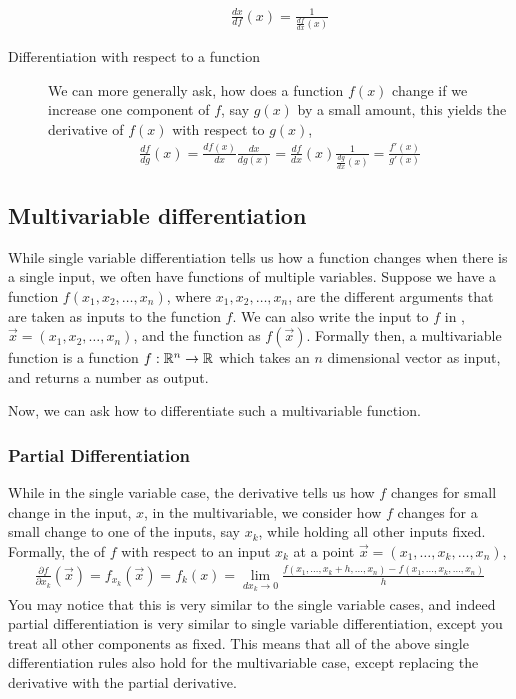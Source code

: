 \begin{description}
    \begin{align*}
        \frac{dx}{df}(x) = \frac{1}{\frac{df}{dx}(x)}
    \end{align*}  
    \item[Differentiation with respect to a function] We can more generally ask, how does a function $f(x)$ change if we increase one component of $f$, say $g(x)$ by a small amount, this yields the derivative of $f(x)$ with respect to $g(x)$,
    \begin{align*}
        \frac{df}{dg}(x) = \frac{df(x)}{dx} \frac{dx}{dg(x)} = \frac{df}{dx}(x) \frac{1}{\frac{dg}{dx}(x)} = \frac{f'(x)}{g'(x)}
    \end{align*}
\end{description}

\subsection*{Multivariable differentiation}
While single variable differentiation tells us how a function changes when there is a single input, we often have functions of multiple variables. Suppose we have a function $f(x_1, x_2, \dots, x_n)$, where $x_1, x_2, \dots, x_n$, are the different arguments that are taken as inputs to the function $f$. We can also write the input to $f$ in , $\vec{x} = (x_1, x_2, \dots, x_n)$, and the function as $f(\vec{x})$. Formally then, a multivariable function is a function $f: \mathbb{R}^n \to \mathbb{R}$ which takes an $n$ dimensional vector as input, and returns a number as output. 

Now, we can ask how to differentiate such a multivariable function. 

\subsubsection*{Partial Differentiation}
While in the single variable case, the derivative tells us how $f$ changes for small change in the input, $x$, in the multivariable, we consider how $f$ changes for a small change to one of the inputs, say $x_k$, while holding all other inputs fixed. Formally, the  of $f$ with respect to an input $x_k$ at a point $\vec{x} = (x_1, \dots, x_k, \dots, x_n)$,
\begin{align*}
    \frac{\partial f}{\partial x_k}(\vec{x}) = f_{x_k}(\vec{x}) = f_k(x) = \lim_{dx_k \to 0} \frac{f(x_1, \dots, x_k + h, \dots, x_n) - f(x_1, \dots, x_k, \dots, x_n)}{h}
\end{align*}
You may notice that this is very similar to the single variable cases, and indeed partial differentiation is very similar to single variable differentiation, except you treat all other components as fixed. This means that all of the above single differentiation rules also hold for the multivariable case, except replacing the derivative with the partial derivative. 


